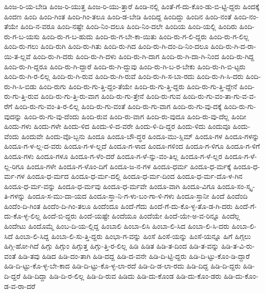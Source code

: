 {ಹಿಂಜ-ರಿ-ಯ-ಬೇಡಿ
ಹಿಂಜ-ರಿ-ಯುತ್ತ
ಹಿಂಜ-ರಿ-ಯು-ತ್ತಾರೆ
ಹಿಂಡಿ-ನಲ್ಲಿ
ಹಿಂತೆ-ಗೆ-ದು-ಕೊಂ-ಡು-ಬಿ-ಟ್ಟಿ-ದ್ದರು
ಹಿಂದಕ್ಕೆ
ಹಿಂದಣ
ಹಿಂದಿ
ಹಿಂದಿ-ಗಿಂತ
ಹಿಂದಿ-ಗಿಂ-ತಲೂ
ಹಿಂದಿ-ಡ-ಬೇಡಿ
ಹಿಂದಿದ್ದ
ಹಿಂದಿದ್ದು
ಹಿಂದಿನ
ಹಿಂದಿ-ನಂತೆ
ಹಿಂದಿ-ನಂ-ತೆಯೇ
ಹಿಂದಿ-ನ-ವರೂ
ಹಿಂದಿ-ನಷ್ಟೇ
ಹಿಂದಿ-ನಿಂ-ದಲೂ
ಹಿಂದಿ-ನಿಂ-ದಲೇ
ಹಿಂದಿಯ
ಹಿಂದಿ-ಯಲ್ಲಿ
ಹಿಂದಿರು
ಹಿಂದಿ-ರು-ಗ-ಬ-ಯಸು
ಹಿಂದಿ-ರು-ಗ-ಬ-ಹುದು
ಹಿಂದಿ-ರು-ಗ-ಬೇ-ಕಾ-ಯಿತು
ಹಿಂದಿ-ರು-ಗ-ಲಿ-ದ್ದರು
ಹಿಂದಿ-ರು-ಗ-ಲಿಲ್ಲ
ಹಿಂದಿ-ರು-ಗಲು
ಹಿಂದಿ-ರುಗಿ
ಹಿಂದಿ-ರು-ಗಿತು
ಹಿಂದಿ-ರು-ಗಿದ
ಹಿಂದಿ-ರು-ಗಿ-ದಂ-ದಿ-ನಿಂ-ದಲೂ
ಹಿಂದಿ-ರು-ಗಿ-ದ-ರಾ-ಯಿ-ತ-ಲ್ಲವೆ
ಹಿಂದಿ-ರು-ಗಿ-ದರು
ಹಿಂದಿ-ರು-ಗಿ-ದಳು
ಹಿಂದಿ-ರು-ಗಿ-ದಾಗ
ಹಿಂದಿ-ರು-ಗಿ-ದಾ-ಗಿ-ನಿಂದ
ಹಿಂದಿ-ರು-ಗಿದ್ದ
ಹಿಂದಿ-ರು-ಗಿ-ದ್ದರೂ
ಹಿಂದಿ-ರು-ಗಿ-ದ್ದಾರೆ
ಹಿಂದಿ-ರು-ಗಿ-ದ್ದುವು
ಹಿಂದಿ-ರು-ಗಿ-ಬ-ರ-ಬೇಕು
ಹಿಂದಿ-ರು-ಗಿ-ಬಿ-ಟ್ಟರು
ಹಿಂದಿ-ರು-ಗಿ-ರ-ಲಿಲ್ಲ
ಹಿಂದಿ-ರು-ಗಿ-ರುವ
ಹಿಂದಿ-ರು-ಗಿ-ರುವೆ
ಹಿಂದಿ-ರು-ಗಿ-ಸ-ಬಾ-ರದು
ಹಿಂದಿ-ರು-ಗಿ-ಸಿ-ದರು
ಹಿಂದಿ-ರು-ಗಿ-ಸಿ-ಬಿಡು
ಹಿಂದಿ-ರುಗು
ಹಿಂದಿ-ರು-ಗು-ತ್ತಿ-ದ್ದಂ-ತೆಯೇ
ಹಿಂದಿ-ರು-ಗು-ತ್ತಿ-ದ್ದರು
ಹಿಂದಿ-ರು-ಗು-ತ್ತಿ-ದ್ದೇನೆ
ಹಿಂದಿ-ರು-ಗು-ತ್ತಿ-ರುವ
ಹಿಂದಿ-ರು-ಗು-ತ್ತಿ-ರು-ವಾಗ
ಹಿಂದಿ-ರು-ಗು-ತ್ತೇನೆ
ಹಿಂದಿ-ರು-ಗುವ
ಹಿಂದಿ-ರು-ಗು-ವಂ-ತಾ-ಗು-ವ-ವ-ರೆಗೆ
ಹಿಂದಿ-ರು-ಗು-ವಂ-ತಿ-ರ-ಲಿಲ್ಲ
ಹಿಂದಿ-ರು-ಗು-ವಂತೆ
ಹಿಂದಿ-ರು-ಗು-ವಾಗ
ಹಿಂದಿ-ರು-ಗು-ವು-ದಕ್ಕೆ
ಹಿಂದಿ-ರು-ಗು-ವುದನ್ನು
ಹಿಂದಿ-ರು-ಗು-ವು-ದೆಂದು
ಹಿಂದಿ-ರುವ
ಹಿಂದಿ-ರು-ವಾಗ
ಹಿಂದಿ-ರು-ವುದೂ
ಹಿಂದಿ-ರು-ವು-ದೆಲ್ಲ
ಹಿಂದೀ
ಹಿಂದು-ಗಳು
ಹಿಂದು-ಗಳೇ
ಹಿಂದು-ಳಿದ
ಹಿಂದು-ಳಿ-ದ-ವರೇ
ಹಿಂದು-ಳಿ-ದಿ-ದ್ದರ
ಹಿಂದು-ಳಿದು
ಹಿಂದುವೂ
ಹಿಂದು-ವೆಂದು
ಹಿಂದುವೇ
ಹಿಂದು-ವೊ-ಬ್ಬನು
ಹಿಂದೂ
ಹಿಂದೂ-ಬೌ-ದ್ಧರ
ಹಿಂದೂ-ಮು-ಸ್ಲಿಮ್
ಹಿಂದೂ-ಗಳ
ಹಿಂದೂ-ಗಳನ್ನು
ಹಿಂದೂ-ಗ-ಳ-ಲ್ಲ-ದ-ವರು
ಹಿಂದೂ-ಗ-ಳ-ಲ್ಲದೆ
ಹಿಂದೂ-ಗ-ಳಾದ
ಹಿಂದೂ-ಗಳಿಂದ
ಹಿಂದೂ-ಗ-ಳಿಗೂ
ಹಿಂದೂ-ಗ-ಳಿಗೆ
ಹಿಂದೂ-ಗಳು
ಹಿಂದೂ-ಗಳೂ
ಹಿಂದೂ-ಗ-ಳೆಂ-ದರೆ
ಹಿಂದೂ-ಗ-ಳೆ-ನ್ನು-ವಂ-ತಿಲ್ಲ
ಹಿಂದೂ-ಗ-ಳೆ-ಲ್ಲರ
ಹಿಂದೂ-ಗ-ಳೆ-ಲ್ಲ-ರಿಗೂ
ಹಿಂದೂ-ಗಳೇ
ಹಿಂದೂ-ಗ-ಳೊಂ-ದಿಗೆ
ಹಿಂದೂ-ಜ-ನ-ಗಳ
ಹಿಂದೂ-ಧರ್ಮ
ಹಿಂದೂ-ಧ-ರ್ಮಕ್ಕೆ
ಹಿಂದೂ-ಧ-ರ್ಮ-ಗಳ
ಹಿಂದೂ-ಧ-ರ್ಮದ
ಹಿಂದೂ-ಧ-ರ್ಮ-ದಲ್ಲಿ
ಹಿಂದೂ-ಧ-ರ್ಮ-ದಿಂದ
ಹಿಂದೂ-ಧ-ರ್ಮ-ದೊ-ಳ-ಗಿನ
ಹಿಂದೂ-ಧ-ರ್ಮ-ವನ್ನು
ಹಿಂದೂ-ಧ-ರ್ಮವು
ಹಿಂದೂ-ಧ-ರ್ಮವೇ
ಹಿಂದೂ-ವಾಗಿ
ಹಿಂದೂ-ವಿಗೂ
ಹಿಂದೂ-ಸಂ-ಸ್ಕೃ-ತಿ-ಗಳನ್ನು
ಹಿಂದೂ-ಸ-ಮು-ದಾ-ಯದ
ಹಿಂದೂ-ಸ್ತಾ-ನಿ-ಗ-ಳು-ಬಂ-ಗಾ-ಳಿ-ಗಳು
ಹಿಂದೂ-ಸ್ತಾನೀ
ಹಿಂದೆ
ಹಿಂದೆಂದಿ
ಹಿಂದೆಂ-ದಿ-ಗಿಂತ
ಹಿಂದೆಂ-ದಿ-ಗಿಂ-ತಲೂ
ಹಿಂದೆಂದೂ
ಹಿಂದೆ-ಗೆದು
ಹಿಂದೆ-ಗೆ-ದು-ಕೊ-ಳ್ಳ-ತೊ-ಡ-ಗಿ-ದರು
ಹಿಂದೆ-ಗೆ-ದು-ಕೊ-ಳ್ಳ-ಲಿಲ್ಲ
ಹಿಂದೆ-ಬಿ-ದ್ದರು
ಹಿಂದೆ-ಯಷ್ಟೇ
ಹಿಂದೆಯೂ
ಹಿಂದೆಯೇ
ಹಿಂದೆ-ಯೇ-ಅ-ವ-ರಿನ್ನೂ
ಹಿಂದೆಲ್ಲ
ಹಿಂದೇಟು
ಹಿಂದೊಮ್ಮೆ
ಹಿಂಬ-ದಿ-ಯ-ಲ್ಲಿದ್ದ
ಹಿಂಬಾಲಿ
ಹಿಂಬಾ-ಲಿಸಿ
ಹಿಂಬಾ-ಲಿ-ಸಿದ
ಹಿಂಬಾ-ಲಿ-ಸಿ-ದರು
ಹಿಂಬಾ-ಲಿ-ಸಿದೆ
ಹಿಂಬಾ-ಲಿ-ಸಿದ್ದ
ಹಿಂಬಾ-ಲಿ-ಸು-ತ್ತಿ-ದ್ದರು
ಹಿಂಭಾ-ಗ-ವನ್ನು
ಹಿಂಸೆ
ಹಿಂಸೆ-ಯನ್ನು
ಹಿಂಸೆ-ಯನ್ನೂ
ಹಿಗೆ
ಹಿಗ್ಗಲು
ಹಿಗ್ಗಿ-ಹೋ-ಗಿದೆ
ಹಿಗ್ಗು
ಹಿಗ್ಗುಂ
ಹಿಗ್ಗುತ್ತ
ಹಿಗ್ಗು-ತ್ತಿ-ರ-ಲಿಲ್ಲ
ಹಿಡಿ
ಹಿಡಿತ
ಹಿಡಿ-ತ-ದಿಂದ
ಹಿಡಿ-ತ-ವನ್ನು
ಹಿಡಿ-ತ-ವಿ-ರು-ವಂತೆ
ಹಿಡಿ-ತವು
ಹಿಡಿದ
ಹಿಡಿ-ದಂ-ತಾಗಿ
ಹಿಡಿ-ದದ್ದ
ಹಿಡಿ-ದ-ವನೇ
ಹಿಡಿ-ದಿ-ಟ್ಟಿ-ದ್ದರು
ಹಿಡಿ-ದಿ-ಟ್ಟು-ಕೊಂ-ಡಿ-ದ್ದಾರೆ
ಹಿಡಿ-ದಿ-ಟ್ಟು-ಕೊ-ಳ್ಳ-ಬೇ-ಕಾದ
ಹಿಡಿ-ದಿ-ಟ್ಟು-ಕೊ-ಳ್ಳ-ಲಾ-ರದೆ
ಹಿಡಿ-ದಿ-ಡ-ಲಾ-ರದು
ಹಿಡಿ-ದಿದ್ದ
ಹಿಡಿ-ದಿ-ದ್ದರು
ಹಿಡಿ-ದಿ-ದ್ದರೆ
ಹಿಡಿ-ದಿದ್ದಾ
ಹಿಡಿ-ದಿ-ರ-ಲಿಲ್ಲ
ಹಿಡಿ-ದಿ-ರುವ
ಹಿಡಿದು
ಹಿಡಿ-ದು-ಕೊಂಡ
ಹಿಡಿ-ದು-ಕೊಂ-ಡರು
ಹಿಡಿ-ದು-ಕೊಂ-ಡ-ವ-ರಾ-ದರೆ
}
